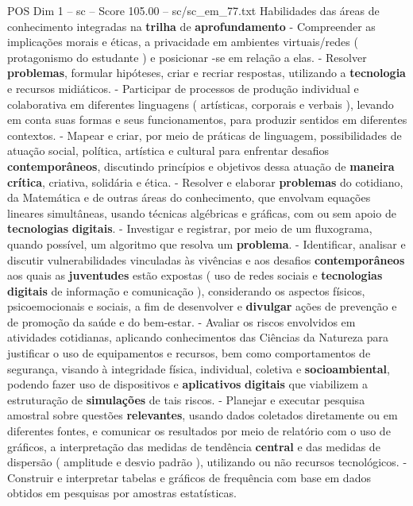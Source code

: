 \begin{textsample}{POS Dim 1 – sc – Score 105.00 – sc/sc\_em\_77.txt}
Habilidades das áreas de conhecimento integradas na \textbf{trilha} de \textbf{aprofundamento} - Compreender as implicações morais e éticas, a privacidade em ambientes virtuais/redes ( protagonismo do estudante ) e posicionar -se em relação a elas. - Resolver \textbf{problemas}, formular hipóteses, criar e recriar respostas, utilizando a \textbf{tecnologia} e recursos midiáticos. - Participar de processos de produção individual e colaborativa em diferentes linguagens ( artísticas, corporais e verbais ), levando em conta suas formas e seus funcionamentos, para produzir sentidos em diferentes contextos. - Mapear e criar, por meio de práticas de linguagem, possibilidades de atuação social, política, artística e cultural para enfrentar desafios \textbf{contemporâneos}, discutindo princípios e objetivos dessa atuação de \textbf{maneira} \textbf{crítica}, criativa, solidária e ética. - Resolver e elaborar \textbf{problemas} do cotidiano, da Matemática e de outras áreas do conhecimento, que envolvam equações lineares simultâneas, usando técnicas algébricas e gráficas, com ou sem apoio de \textbf{tecnologias} \textbf{digitais}. - Investigar e registrar, por meio de um fluxograma, quando possível, um algoritmo que resolva um \textbf{problema}. - Identificar, analisar e discutir vulnerabilidades vinculadas às vivências e aos desafios \textbf{contemporâneos} aos quais as \textbf{juventudes} estão expostas ( uso de redes sociais e \textbf{tecnologias} \textbf{digitais} de informação e comunicação ), considerando os aspectos físicos, psicoemocionais e sociais, a fim de desenvolver e \textbf{divulgar} ações de prevenção e de promoção da saúde e do bem-estar. - Avaliar os riscos envolvidos em atividades cotidianas, aplicando conhecimentos das Ciências da Natureza para justificar o uso de equipamentos e recursos, bem como comportamentos de segurança, visando à integridade física, individual, coletiva e \textbf{socioambiental}, podendo fazer uso de dispositivos e \textbf{aplicativos} \textbf{digitais} que viabilizem a estruturação de \textbf{simulações} de tais riscos. - Planejar e executar pesquisa amostral sobre questões \textbf{relevantes}, usando dados coletados diretamente ou em diferentes fontes, e comunicar os resultados por meio de relatório com o uso de gráficos, a interpretação das medidas de tendência \textbf{central} e das medidas de dispersão ( amplitude e desvio padrão ), utilizando ou não recursos tecnológicos. - Construir e interpretar tabelas e gráficos de frequência com base em dados obtidos em pesquisas por amostras estatísticas.

\end{textsample}
